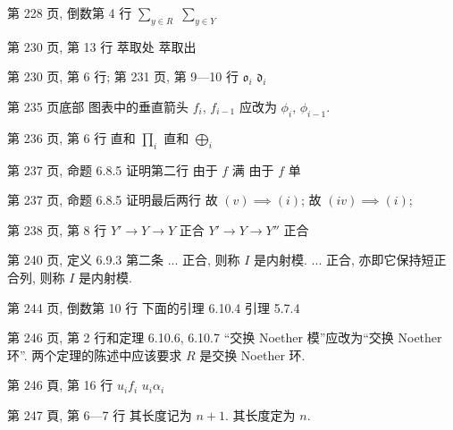 \documentclass{AJerrata}
\begin{document}
\begin{Errata}
        \item[第 228 页, 倒数第 4 行]
        \Orig $\sum_{y \in R}$
        \Corr $\sum_{y \in Y}$
        
        \item[第 230 页, 第 13 行]
        \Orig 萃取处
        \Corr 萃取出
        
		\item[第 230 页, 第 6 行; 第 231 页, 第 9---10 行]
		\Orig $\mathfrak{o}_i$
		\Corr $\mathfrak{d}_i$
        
        \item[第 235 页底部]
        图表中的垂直箭头 $f_i$, $f_{i-1}$ 应改为 $\phi_i$, $\phi_{i-1}$.
        
        \item[第 236 页, 第 6 行]
        \Orig 直和 $\prod_i$
        \Corr 直和 $\bigoplus_i$
        
        \item[第 237 页, 命题 6.8.5 证明第二行]
        \Orig 由于 $f$ 满
        \Corr 由于 $f$ 单
        
        \item[第 237 页, 命题 6.8.5 证明最后两行]
        \Orig 故 $(v) \implies (i)$;
        \Corr 故 $(iv) \implies (i)$;
        
        \item[第 238 页, 第 8 行]
        \Orig $Y' \to Y \to Y$ 正合
        \Corr $Y' \to Y \to Y''$ 正合
        
       \item[第 240 页, 定义 6.9.3 第二条]
       \Orig ... 正合, 则称 $I$ 是内射模.
       \Corr ... 正合, 亦即它保持短正合列, 则称 $I$ 是内射模.
        
   		\item[第 244 页, 倒数第 10 行]
        \Orig 下面的引理 6.10.4
        \Corr 引理 5.7.4
        
   		\item[第 246 页, 第 2 行和定理 6.10.6, 6.10.7]
		``交换 Noether 模''应改为``交换 Noether 环''. 两个定理的陈述中应该要求 $R$ 是交换 Noether 环.
        
        \item[第 246 頁, 第 16 行]
        \Orig $u_i f_i$
        \Corr $u_i \alpha_i$
        
        \item[第 247 頁, 第 6---7 行]
        \Orig 其长度记为 $n+1$.
        \Corr 其长度定为 $n$.


\end{Errata}
\end{document}
